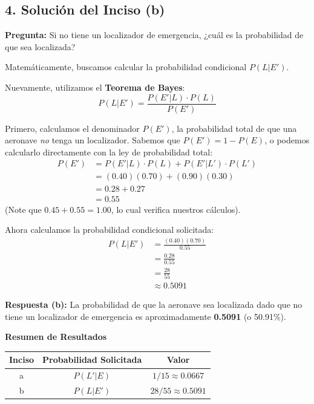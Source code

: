 \documentclass[a4paper]{article}
\begin{document}
\subsection*{4. Solución del Inciso (b)}

\textbf{Pregunta:} Si no tiene un localizador de emergencia, ¿cuál es la probabilidad de que sea localizada?

Matemáticamente, buscamos calcular la probabilidad condicional $P(L | E')$.

Nuevamente, utilizamos el \textbf{Teorema de Bayes}:
$$ P(L | E') = \frac{P(E' | L) \cdot P(L)}{P(E')} $$

Primero, calculamos el denominador $P(E')$, la probabilidad total de que una aeronave \textit{no} tenga un localizador. Sabemos que $P(E') = 1 - P(E)$, o podemos calcularlo directamente con la ley de probabilidad total:
\begin{align*}
    P(E') &= P(E' | L) \cdot P(L) + P(E' | L') \cdot P(L') \\
    &= (0.40)(0.70) + (0.90)(0.30) \\
    &= 0.28 + 0.27 \\
    &= 0.55
\end{align*}
(Note que $0.45 + 0.55 = 1.00$, lo cual verifica nuestros cálculos).

Ahora calculamos la probabilidad condicional solicitada:
\begin{align*}
    P(L | E') &= \frac{(0.40)(0.70)}{0.55} \\
    &= \frac{0.28}{0.55} \\
    &= \frac{28}{55} \\
    &\approx 0.5091
\end{align*}

\textbf{Respuesta (b):} La probabilidad de que la aeronave sea localizada dado que no tiene un localizador de emergencia es aproximadamente \textbf{0.5091} (o 50.91\%).

\vspace{0.5cm}

\textbf{Resumen de Resultados}

\begin{center}
\begin{tabular}{|c|c|c|}
\hline
\textbf{Inciso} & \textbf{Probabilidad Solicitada} & \textbf{Valor} \\
\hline
a & $P(L' | E)$ & $1/15 \approx 0.0667$ \\
\hline
b & $P(L | E')$ & $28/55 \approx 0.5091$ \\
\hline
\end{tabular}
\end{center}
\end{document}
